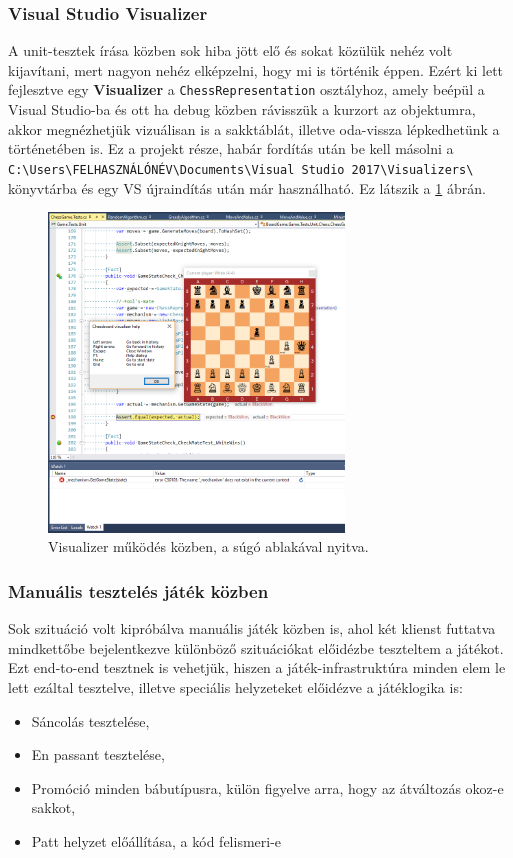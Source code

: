 \documentclass[twoside, a4paper, 12pt]{article}
\begin{document}
\subsubsection{Visual Studio Visualizer}
A unit-tesztek írása közben sok hiba jött elő és sokat közülük nehéz volt kijavítani, mert nagyon nehéz elképzelni, hogy mi is történik éppen. Ezért ki lett fejlesztve egy \textbf{Visualizer} a \texttt{ChessRepresentation} osztályhoz, amely beépül a Visual Studio-ba és ott ha debug közben rávisszük a kurzort az objektumra, akkor megnézhetjük vizuálisan is a sakktáblát, illetve oda-vissza lépkedhetünk a történetében is. Ez a projekt része, habár fordítás után be kell másolni a \texttt{C:\textbackslash Users\textbackslash FELHASZNÁLÓNÉV\textbackslash Documents\textbackslash Visual Studio 2017\textbackslash Visualizers\textbackslash} könyvtárba és egy VS újraindítás után már használható. Ez látszik a \ref{fig:visualizer} ábrán.

\begin{figure}[htbp]
	\centering
	\includegraphics[width=0.7\textwidth]{img/visualizer.png}
	\caption{Visualizer működés közben, a súgó ablakával nyitva.}
	\label{fig:visualizer}
\end{figure}

\subsubsection{Manuális tesztelés játék közben}
Sok szituáció volt kipróbálva manuális játék közben is, ahol két klienst futtatva mindkettőbe bejelentkezve különböző szituációkat előidézbe teszteltem a játékot. Ezt end-to-end tesztnek is vehetjük, hiszen a játék-infrastruktúra minden elem le lett ezáltal tesztelve, illetve speciális helyzeteket előidézve a játéklogika is:
\begin{itemize}
	\item Sáncolás tesztelése,
	\item En passant tesztelése,
	\item Promóció minden bábutípusra, külön figyelve arra, hogy az átváltozás okoz-e sakkot,
	\item Patt helyzet előállítása, a kód felismeri-e
\end{itemize}
\end{document}
